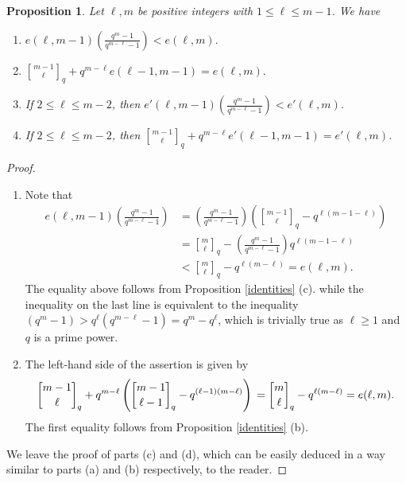 \documentclass[10pt,a4paper]{amsart}
\newtheorem{proposition}{Proposition}
\begin{document}
\begin{proposition}\label{ineq}
    Let $\ell, m$ be positive integers with $1 \le \ell \le m-1$. We have 
    \begin{enumerate}
        \item[(a)] $e (\ell, m-1) \left(\frac{q^m -1}{q^{m-\ell} - 1}\right) < e (\ell, m).$
        \item[(b)] ${m - 1 \brack \ell}_q + q^{m-\ell} e (\ell -1, m-1) = e (\ell, m). $
        \item[(c)] If $2 \le \ell \le m-2$, then $e' (\ell, m-1) \left(\frac{q^m -1}{q^{m-\ell} - 1}\right) < e' (\ell, m).$
        \item[(d)] If $2 \le \ell \le m-2$, then ${m - 1 \brack \ell}_q + q^{m-\ell} e' (\ell -1, m-1) = e' (\ell, m)$.
    \end{enumerate}
\end{proposition}

\begin{proof}
    \
    \begin{enumerate}
        \item[(a)] Note that \begin{align*}
        e (\ell, m-1) \left(\frac{q^m -1}{q^{m-\ell} - 1}\right) &=\left(\frac{q^m - 1}{q^{m-\ell} - 1} \right) \left( {m - 1 \brack \ell}_q - q^{\ell(m-1 - \ell)} \right) \\
        &= {m \brack \ell}_q - \left(\frac{q^m - 1}{q^{m-\ell} - 1}\right) q^{\ell(m-1 - \ell)} \\
        &< {m \brack \ell}_q - q^{\ell (m-\ell)} = e(\ell, m).
    \end{align*}
    The equality above follows from Proposition \ref{identities} (c). 
    while the inequality on the last line is equivalent to the inequality $(q^m - 1) > q^\ell (q^{m - \ell} - 1) = q^m - q^\ell$, which is trivially true as $\ell \ge 1$ and $q$ is a prime power. 
    \item[(b)] The left-hand side of the assertion is given by
        \begin{equation*}
        {m - 1 \brack \ell}_q + q^{m - \ell} \left({ m - 1 \brack \ell - 1}_q - q^{(\ell-1)(m - \ell)} \right) \\
       =  {m \brack \ell}_q - q^{\ell(m- \ell)} = e(\ell, m). 
    \end{equation*} 
    The first equality follows from  Proposition \ref{identities} (b). 
    \end{enumerate}
    We leave the proof of parts (c) and (d), which can be easily deduced in a way similar to parts (a) and (b) respectively, to the reader. 
\end{proof}
\end{document}
